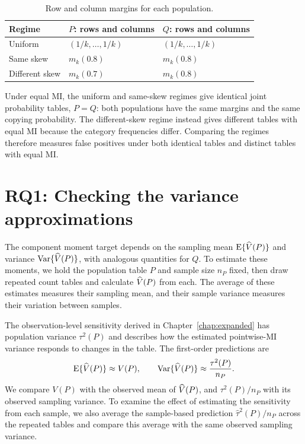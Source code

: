 \begin{table}[htbp]
\centering
\caption{Row and column margins for each population.}
\label{tab:margin-profiles}
\thesistableformat
\begin{tabular}{@{}lll@{}}
\toprule
\textbf{Regime} & \(P\): \textbf{rows and columns} & \(Q\): \textbf{rows and columns}\\
\midrule
Uniform & \((1/k,\ldots,1/k)\) & \((1/k,\ldots,1/k)\)\\
\addlinespace[0.3em]
Same skew & \(m_k(0.8)\) & \(m_k(0.8)\)\\
\addlinespace[0.3em]
Different skew & \(m_k(0.7)\) & \(m_k(0.8)\)\\
\bottomrule
\end{tabular}
\end{table}

Under equal MI, the uniform and same-skew regimes give identical joint
probability tables, \(P=Q\): both populations have the same margins and
the same copying probability. The different-skew regime instead gives
different tables with equal MI because the category frequencies differ.
Comparing the regimes therefore measures false positives under both
identical tables and distinct tables with equal MI.

\section{RQ1: Checking the variance approximations}

The component moment target depends on the sampling mean
\(\operatorname{E}\{\widehat V(P)\}\) and variance \(\operatorname{Var}\{\widehat V(P)\}\), with analogous
quantities for \(Q\). To estimate these moments, we hold the population
table \(P\) and sample size \(n_P\) fixed, then draw repeated count tables
and calculate \(\widehat V(P)\) from each. The average of these estimates
measures their sampling mean, and their sample variance measures their
variation between samples.

The observation-level sensitivity derived in Chapter~\ref{chap:expanded}
has population variance \(\tau^2(P)\) and describes how the estimated
pointwise-MI variance responds to changes in the table. The first-order predictions are
\begin{equation}
 \operatorname{E}\{\widehat V(P)\}\approx V(P),\qquad
 \operatorname{Var}\{\widehat V(P)\}\approx\frac{\tau^2(P)}{n_P}.
 \label{eq:redesign-moment-approximations}
\end{equation}
We compare \(V(P)\) with the observed mean of \(\widehat V(P)\), and
\(\tau^2(P)/n_P\) with its observed sampling variance. To examine the effect of estimating the sensitivity from each sample,
we also average the sample-based prediction \(\widehat\tau^2(P)/n_P\)
across the repeated tables and compare this average with the same observed
sampling variance.

